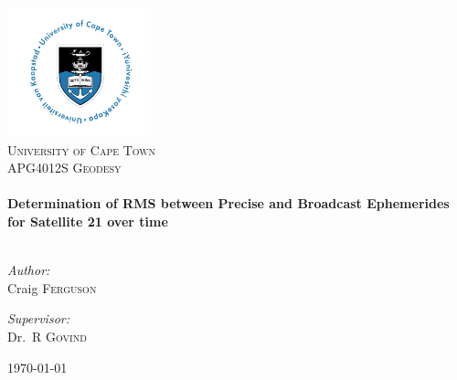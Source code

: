 \begin{titlepage} \begin{center} 
\includegraphics[width=0.3\textwidth]{./logo}~\\[1cm] \textsc{\LARGE University of Cape Town}\\[1.5cm] \textsc{\Large APG4012S Geodesy}\\[0.5cm] 
\HRule \\[0.4cm] { \huge \bfseries Determination of RMS between Precise and Broadcast Ephemerides for Satellite 21 over time \\[0.4cm] } \HRule \\[1.5cm]
  \noindent \begin{minipage}[t]{0.4\textwidth} \begin{flushleft} \large \emph{Author:}\\ Craig \textsc{Ferguson} \end{flushleft} \end{minipage}
% 
  \begin{minipage}[t]{0.4\textwidth} \begin{flushright} \large \emph{Supervisor:} \\ Dr.~R \textsc{Govind} \end{flushright} \end{minipage} \vfill 
  {\large \today} \end{center} \end{titlepage}